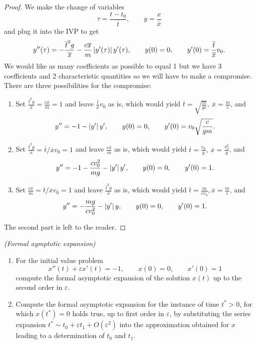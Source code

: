 \begin{proof}
  We make the change of variables
  \[
    \tau = \frac{t - t_0}{\overline{t}},\qquad
    y = \frac{x}{\overline{x}}
  \]
  and plug it into the IVP to get
  \[
      y''(\tau) = - \frac{\overline{t}^2 g}{\overline{x}}
        - \frac{c\overline{x}}{m} \left\vert{y'(\tau)}\right\vert y'(\tau),\qquad
      y(0) = 0,\qquad
      y'(0) = \frac{\overline{t}}{\overline{x}} v_0.
  \]
  We would like as many coefficients as possible to equal 1 but we have 3
  coefficients and 2 characteristic quantities so we will have to make a
  compromise. There are three possibilities for the compromise:
  \begin{enumerate}
    \item Set $\frac{\overline{t}^2 g}{\overline{x}} = \frac{c\overline{x}}{m}
      = 1$ and leave $\frac{\overline{t}}{\overline{x}} v_0$ as is, which would
      yield $\overline{t} = \sqrt{\frac{m}{gc} },\ \overline{x} = \frac{m}{c} $, and
      \[
        y'' = -1 - \left\vert{y'}\right\vert{y'},\qquad
        y(0) = 0,\qquad
        y'(0) = v_0\sqrt{\frac{c}{gm}}. 
      \]
    \item Set $\frac{\overline{t}^2 g}{\overline{x}} =
      \overline{t}/\overline{x} v_0 = 1$ and leave $\frac{c\overline{x}}{m}$ as
      is, which would yield $\overline{t} = \frac{v_0}{g},\ \overline{x} =
      \frac{v_0^2}{g}$, and
      \[
        y'' = -1 - \frac{cv_0^2}{mg} - \left\vert{y'}\right\vert y',\qquad
        y(0) = 0,\qquad
        y'(0) = 1.
      \]
    \item Set $\frac{c\overline{x}}{m} = \overline{t}/\overline{x} v_0 = 1$
      and leave $\frac{\overline{t}^2 g}{\overline{x}}$ as is, which would
      yield $\overline{t} = \frac{m}{c v_0}, \overline{x} = \frac{m}{c}$, and
      \[
        y'' = - \frac{mg}{cv_0^2} - \left\vert{y'}\right\vert y,\qquad
        y(0) = 0,\qquad
        y'(0) = 1.
      \]
  \end{enumerate}

  The second part is left to the reader.
\end{proof}


\begin{ex}
  [1.8]
  \textit{(Formal aymptotic expansion)}
  \begin{enumerate}
    \item For the initial value problem
      \[
        x''(t) + \varepsilon x'(t) = -1,\qquad
        x(0) = 0,\qquad
        x'(0) = 1
      \]
      compute the formal asymptotic expansion of the solution $x(t)$ up to the
      second order in $\varepsilon$.
    \item Compute the formal asymptotic expansion for the instance of time $t^*
      > 0$, for which $x(t^*) = 0$ holds true, up to first order in
      $\varepsilon$, by substituting the series expansion $t^* \sim t_0 +
      \varepsilon t_1 + O(\varepsilon^2)$ into the approximation obtained for
      $x$ leading to a determination of $t_0$ and $t_1$.
  \end{enumerate}
\end{ex}

